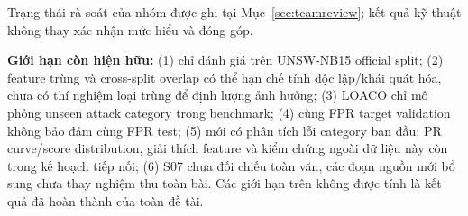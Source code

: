 \documentclass[12pt,a4paper,oneside]{report}
\begin{document}
Trạng thái rà soát của nhóm được ghi tại Mục~\ref{sec:teamreview}; kết quả kỹ thuật không thay xác nhận mức hiểu và đóng góp.

\textbf{Giới hạn còn hiện hữu:} (1) chỉ đánh giá trên UNSW-NB15 official split; (2) feature trùng và cross-split overlap có thể hạn chế tính độc lập/khái quát hóa, chưa có thí nghiệm loại trùng để định lượng ảnh hưởng; (3) LOACO chỉ mô phỏng unseen attack category trong benchmark; (4) cùng FPR target validation không bảo đảm cùng FPR test; (5) mới có phân tích lỗi category ban đầu; PR curve/score distribution, giải thích feature và kiểm chứng ngoài dữ liệu này còn trong kế hoạch tiếp nối; (6) S07 chưa đối chiếu toàn văn, các đoạn nguồn mới bổ sung chưa thay nghiệm thu toàn bài. Các giới hạn trên không được tính là kết quả đã hoàn thành của toàn đề tài.
\clearpage
\end{document}
